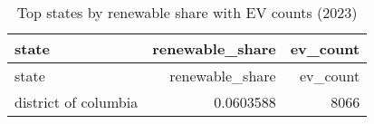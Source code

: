 \documentclass[
  english,
  letterpaper,
  DIV=11,
  numbers=noendperiod]{scrartcl}
\begin{document}
\begin{longtable}[]{@{}lrr@{}}
\caption{Top states by renewable share with EV counts
(2023)}\tabularnewline
\toprule\noalign{}
state & renewable\_share & ev\_count \\
\midrule\noalign{}
\endfirsthead
\toprule\noalign{}
state & renewable\_share & ev\_count \\
\midrule\noalign{}
\endhead
\bottomrule\noalign{}
\endlastfoot
district of columbia & 0.0603588 & 8066 \\
\end{longtable}
\end{document}
